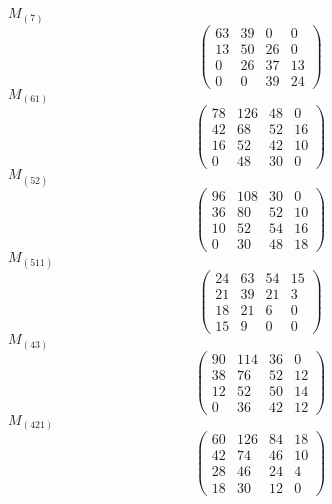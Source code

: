 \documentclass[12pt,reqno]{amsart}
\begin{document}
\Large
$M_{(7)}$                             $$ \begin{pmatrix} 
                          63 & 39 & 0 & 0 \\[6pt]
                         13 & 50 & 26 & 0 \\[6pt]
                         0 & 26 & 37 & 13 \\[6pt]
                            0 & 0 & 39 & 24
                              \end{pmatrix} $$ 
$M_{(61)}$                             $$ \begin{pmatrix} 
                         78 & 126 & 48 & 0 \\[6pt]
                         42 & 68 & 52 & 16 \\[6pt]
                         16 & 52 & 42 & 10 \\[6pt]
                            0 & 48 & 30 & 0
                              \end{pmatrix} $$ 
$M_{(52)}$                             $$ \begin{pmatrix} 
                         96 & 108 & 30 & 0 \\[6pt]
                         36 & 80 & 52 & 10 \\[6pt]
                         10 & 52 & 54 & 16 \\[6pt]
                           0 & 30 & 48 & 18
                              \end{pmatrix} $$ 
$M_{(511)}$                             $$ \begin{pmatrix} 
                         24 & 63 & 54 & 15 \\[6pt]
                         21 & 39 & 21 & 3 \\[6pt]
                          18 & 21 & 6 & 0 \\[6pt]
                            15 & 9 & 0 & 0
                              \end{pmatrix} $$ 
$M_{(43)}$                             $$ \begin{pmatrix} 
                         90 & 114 & 36 & 0 \\[6pt]
                         38 & 76 & 52 & 12 \\[6pt]
                         12 & 52 & 50 & 14 \\[6pt]
                           0 & 36 & 42 & 12
                              \end{pmatrix} $$ 
$M_{(421)}$                             $$ \begin{pmatrix} 
                        60 & 126 & 84 & 18 \\[6pt]
                         42 & 74 & 46 & 10 \\[6pt]
                         28 & 46 & 24 & 4 \\[6pt]
                           18 & 30 & 12 & 0
                              \end{pmatrix} $$ 
\end{document}
